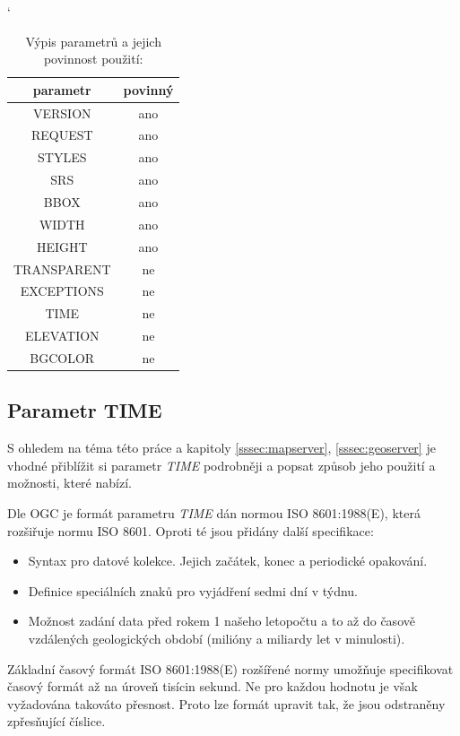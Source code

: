 \bigskip
\begin{table}[h!]
	\catcode`
	\centering
	\begin{tabular}{|c|c|}
		\hline
		parametr & povinný \\ \hline
		\hline
		VERSION & ano \\ \hline
		REQUEST & ano \\ \hline
		STYLES & ano \\ \hline
		SRS & ano \\ \hline
		BBOX & ano \\ \hline
		WIDTH & ano \\ \hline
		HEIGHT & ano \\ \hline
		TRANSPARENT & ne \\ \hline
		EXCEPTIONS & ne \\ \hline
		TIME & ne \\ \hline
		ELEVATION & ne \\ \hline
		BGCOLOR & ne \\ \hline
\end{tabular}
	\caption{Výpis parametrů a jejich povinnost použití: \cite{oqc_wms}}
	\label{tab:WPS_ExecuteRequest}
\end{table}

\subsection{Parametr TIME}
\label{sssec:time}

S ohledem na téma této práce a kapitoly \ref{sssec:mapserver}, \ref{sssec:geoserver} je vhodné přiblížit si parametr
\textit{TIME} podrobněji a popsat způsob jeho použití a možnosti,
které nabízí.

Dle OGC je formát parametru \textit{TIME} dán normou ISO 8601:1988(E),
která rozšiřuje normu ISO 8601. Oproti té jsou přidány další
specifikace\cite{oqc_wms}:
\begin{itemize}
\item Syntax pro datové kolekce. Jejich začátek, konec a periodické
  opakování.
\item Definice speciálních znaků pro vyjádření sedmi dní v týdnu.
\item Možnost zadání data před rokem 1 našeho letopočtu a to až do
  časově vzdálených geologických období (milióny a miliardy let v
  minulosti).
\end{itemize}

Základní časový formát ISO 8601:1988(E) rozšířené normy umožňuje
specifikovat časový formát až na úroveň tisícin sekund. Ne pro každou
hodnotu je však vyžadována takováto přesnost. Proto lze formát upravit
tak, že jsou odstraněny zpřesňující číslice.

